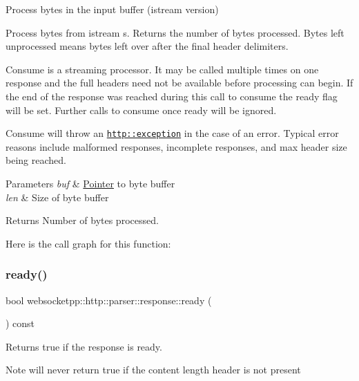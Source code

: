Process bytes in the input buffer (istream version) 

Process bytes from istream s. Returns the number of bytes processed. Bytes left unprocessed means bytes left over after the final header delimiters.

Consume is a streaming processor. It may be called multiple times on one response and the full headers need not be available before processing can begin. If the end of the response was reached during this call to consume the ready flag will be set. Further calls to consume once ready will be ignored.

Consume will throw an \href{http::exception}{\tt http\+::exception} in the case of an error. Typical error reasons include malformed responses, incomplete responses, and max header size being reached.


\begin{DoxyParams}{Parameters}
{\em buf} & \mbox{\hyperlink{struct_pointer}{Pointer}} to byte buffer \\
\hline
{\em len} & Size of byte buffer \\
\hline
\end{DoxyParams}
\begin{DoxyReturn}{Returns}
Number of bytes processed. 
\end{DoxyReturn}
Here is the call graph for this function\+:
\mbox{\label{classwebsocketpp_1_1http_1_1parser_1_1response_ab3f1f2bb2c79a779a8e7d649ea722421}} 
\subsubsection{\texorpdfstring{ready()}{ready()}}
{\footnotesize\ttfamily bool websocketpp\+::http\+::parser\+::response\+::ready (\begin{DoxyParamCaption}{ }\end{DoxyParamCaption}) const\hspace{0.3cm}{\ttfamily [inline]}}



Returns true if the response is ready. 

\begin{DoxyNote}{Note}
will never return true if the content length header is not present 
\end{DoxyNote}
\mbox{\label{classwebsocketpp_1_1http_1_1parser_1_1response_a2576fc301cc6798d5a830298188b4832}} 
